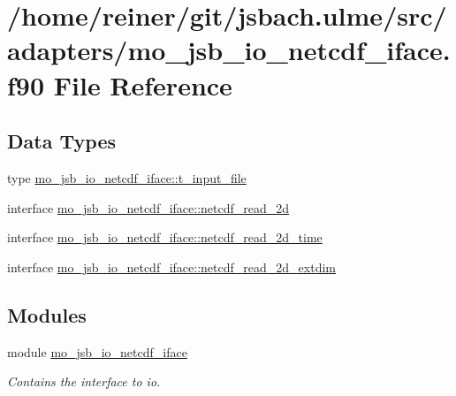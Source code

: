 \hypertarget{mo__jsb__io__netcdf__iface_8f90}{}\section{/home/reiner/git/jsbach.ulme/src/adapters/mo\+\_\+jsb\+\_\+io\+\_\+netcdf\+\_\+iface.f90 File Reference}
\label{mo__jsb__io__netcdf__iface_8f90}
\subsection*{Data Types}
\begin{DoxyCompactItemize}
\item 
type \hyperlink{structmo__jsb__io__netcdf__iface_1_1t__input__file}{mo\+\_\+jsb\+\_\+io\+\_\+netcdf\+\_\+iface\+::t\+\_\+input\+\_\+file}
\item 
interface \hyperlink{interfacemo__jsb__io__netcdf__iface_1_1netcdf__read__2d}{mo\+\_\+jsb\+\_\+io\+\_\+netcdf\+\_\+iface\+::netcdf\+\_\+read\+\_\+2d}
\item 
interface \hyperlink{interfacemo__jsb__io__netcdf__iface_1_1netcdf__read__2d__time}{mo\+\_\+jsb\+\_\+io\+\_\+netcdf\+\_\+iface\+::netcdf\+\_\+read\+\_\+2d\+\_\+time}
\item 
interface \hyperlink{interfacemo__jsb__io__netcdf__iface_1_1netcdf__read__2d__extdim}{mo\+\_\+jsb\+\_\+io\+\_\+netcdf\+\_\+iface\+::netcdf\+\_\+read\+\_\+2d\+\_\+extdim}
\end{DoxyCompactItemize}
\subsection*{Modules}
\begin{DoxyCompactItemize}
\item 
module \hyperlink{namespacemo__jsb__io__netcdf__iface}{mo\+\_\+jsb\+\_\+io\+\_\+netcdf\+\_\+iface}
\begin{DoxyCompactList}\small\item\em Contains the interface to io. \end{DoxyCompactList}\end{DoxyCompactItemize}
